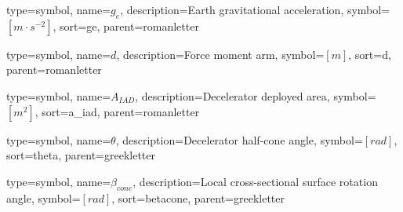 {
type=symbol, %
name={\ensuremath{g_{e}}}, %
description={Earth gravitational acceleration}, %
symbol={$\left[m\cdot s^{-2} \right]$}, %
sort=ge, %
parent=romanletter %
}

{
	type=symbol, %
	name={\ensuremath{d}}, %
	description={Force moment arm}, %
	symbol={$\left[m \right]$}, %
	sort=d, %
	parent=romanletter %
}

{
type=symbol, %
name={\ensuremath{A_{IAD}}}, %
description={Decelerator deployed area}, %
symbol={$\left[m^2 \right]$}, %
sort=a_iad, %
parent=romanletter %
}

{
type=symbol, %
name={\ensuremath{\theta}}, %
description={Decelerator half-cone angle}, %
symbol={$\left[rad \right]$}, %
sort=theta, %
parent=greekletter %
}

{
	type=symbol, %
	name={\ensuremath{\beta_{cone}}}, %
	description={Local cross-sectional surface rotation angle}, %
	symbol={$\left[rad \right]$}, %
	sort=betacone, %
	parent=greekletter %
}

